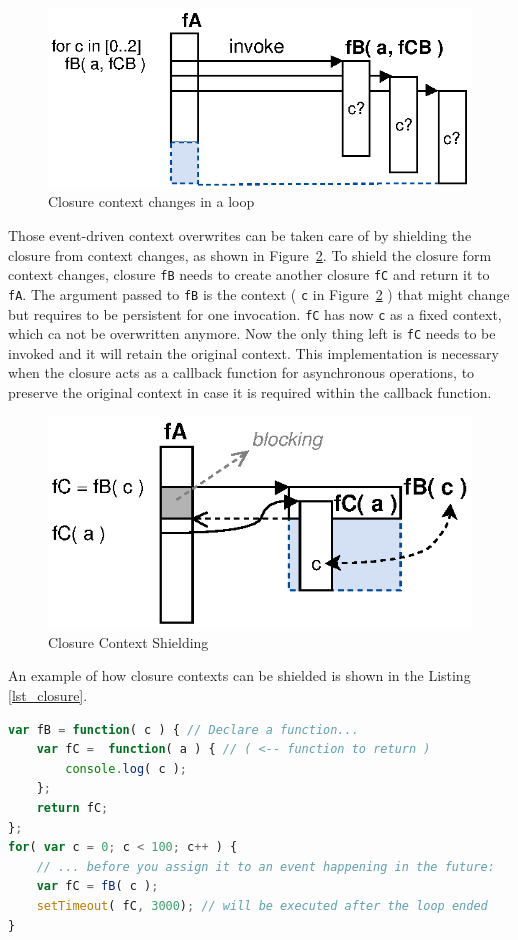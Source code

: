 \begin{figure}[!ht]
	\centering
  \includegraphics{figures/Closures_Closure-2}
	\caption{Closure context changes in a loop}
	\label{fig:Closures_Closure-2}
\end{figure}


Those event-driven context overwrites can be taken care of by shielding the closure from context changes, as shown in Figure~\ref{fig:Closures_Closure-3}.
To shield the closure form context changes, closure \texttt{fB} needs to create another closure \texttt{fC} and return it to \texttt{fA}.
The argument passed to \texttt{fB} is the context ( \texttt{c} in Figure~\ref{fig:Closures_Closure-3} ) that might change but requires to be persistent for one invocation.
\texttt{fC} has now \texttt{c} as a fixed context, which ca not be overwritten anymore.
Now the only thing left is \texttt{fC} needs to be invoked and it will retain the original context.
This implementation is necessary when the closure acts as a callback function for asynchronous operations, to preserve the original context in case it is required within the callback function.
\begin{figure}[!ht]
	\centering
  \includegraphics{figures/Closures_Closure-3}
	\caption{Closure Context Shielding}
	\label{fig:Closures_Closure-3}
\end{figure}


An example of how closure contexts can be shielded is shown in the Listing \ref{lst_closure}.
\begin{lstlisting}[float=h,label=lst_closure,language=JavaScript,caption=JavaScript Closure Context Shielding]
var fB = function( c ) { // Declare a function...
	var fC =  function( a ) { // ( <-- function to return )
		console.log( c );
	};
	return fC;
};
for( var c = 0; c < 100; c++ ) {
	// ... before you assign it to an event happening in the future:
	var fC = fB( c );
	setTimeout( fC, 3000); // will be executed after the loop ended
}
\end{lstlisting}


